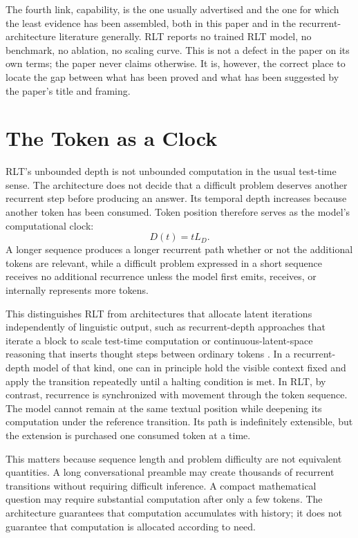 \documentclass[11pt]{article}
\begin{document}
The fourth link, capability, is the one usually advertised and the one for which the least evidence has been assembled, both in this paper and in the recurrent-architecture literature generally. RLT reports no trained RLT model, no benchmark, no ablation, no scaling curve. This is not a defect in the paper on its own terms; the paper never claims otherwise. It is, however, the correct place to locate the gap between what has been proved and what has been suggested by the paper's title and framing.

\section{The Token as a Clock}

RLT's unbounded depth is not unbounded computation in the usual test-time sense. The architecture does not decide that a difficult problem deserves another recurrent step before producing an answer. Its temporal depth increases because another token has been consumed. Token position therefore serves as the model's computational clock:
\[
D(t) = tL_D.
\]
A longer sequence produces a longer recurrent path whether or not the additional tokens are relevant, while a difficult problem expressed in a short sequence receives no additional recurrence unless the model first emits, receives, or internally represents more tokens.

This distinguishes RLT from architectures that allocate latent iterations independently of linguistic output, such as recurrent-depth approaches that iterate a block to scale test-time computation \cite{geiping2025recurrent} or continuous-latent-space reasoning that inserts thought steps between ordinary tokens \cite{hao2024coconut}. In a recurrent-depth model of that kind, one can in principle hold the visible context fixed and apply the transition repeatedly until a halting condition is met. In RLT, by contrast, recurrence is synchronized with movement through the token sequence. The model cannot remain at the same textual position while deepening its computation under the reference transition. Its path is indefinitely extensible, but the extension is purchased one consumed token at a time.

This matters because sequence length and problem difficulty are not equivalent quantities. A long conversational preamble may create thousands of recurrent transitions without requiring difficult inference. A compact mathematical question may require substantial computation after only a few tokens. The architecture guarantees that computation accumulates with history; it does not guarantee that computation is allocated according to need.
\end{document}
